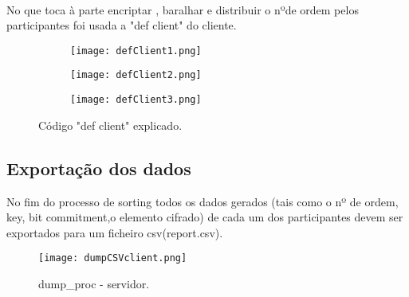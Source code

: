 \documentclass{report}
\begin{document}
\paragraph{}
\newpage
\paragraph{}
\paragraph{}
\paragraph{}
\paragraph{}
No que toca à parte encriptar , baralhar e distribuir o nºde ordem pelos participantes foi usada a "def client" do cliente.

\begin{figure}[hbt!]
\centering
\begin{subfigure}{.5\textwidth}
  \centering
  \texttt{[image: defClient1.png]}
  \caption{}
\end{subfigure}%
\begin{subfigure}{.5\textwidth}
  \centering
  \texttt{[image: defClient2.png]}
  \caption{}
\end{subfigure}
\begin{subfigure}{.5\textwidth}
  \centering
  \texttt{[image: defClient3.png]}
  \caption{}
\end{subfigure}%
	\caption{Código "def client" explicado.}
\end{figure}
\pagebreak
\paragraph{}
\paragraph{}
\paragraph{}

\subsection{Exportação dos dados}
No fim do processo de sorting todos os dados gerados (tais como o nº de ordem, key, bit commitment,o elemento cifrado) de cada um dos participantes devem ser exportados para um ficheiro csv(report.csv).
\begin{figure}[hbt!]
  \centering
  \texttt{[image: dumpCSVclient.png]}
  \caption{dump\_proc - servidor.}
\end{figure}
\end{document}
